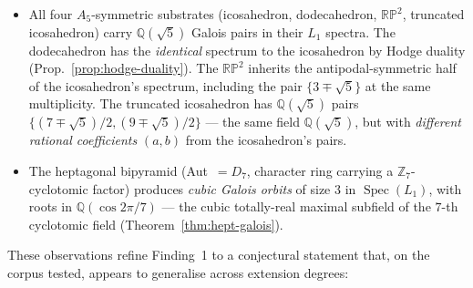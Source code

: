 \documentclass[12pt,a4paper]{article}
\theoremstyle{definition}
\theoremstyle{remark}
\newcommand{\bZ}{\mathbb{Z}}
\newcommand{\bQ}{\mathbb{Q}}                %
\DeclareMathOperator{\Spec}{Spec}
\begin{document}
\begin{itemize}\setlength{\itemsep}{2pt}
\item All four $A_5$-symmetric substrates (icosahedron, dodecahedron,
  $\mathbb{RP}^2$, truncated icosahedron) carry $\bQ(\sqrt 5)$ Galois
  pairs in their $L_1$ spectra. The dodecahedron has the
  \emph{identical} spectrum to the icosahedron by Hodge duality
  (Prop.~\ref{prop:hodge-duality}). The $\mathbb{RP}^2$ inherits the
  antipodal-symmetric half of the icosahedron's spectrum, including
  the pair $\{3 \mp \sqrt 5\}$ at the same multiplicity. The
  truncated icosahedron has $\bQ(\sqrt 5)$ pairs $\{(7 \mp \sqrt 5)/2,
  (9 \mp \sqrt 5)/2\}$ --- the same field $\bQ(\sqrt 5)$, but with
  \emph{different rational coefficients} $(a, b)$ from the
  icosahedron's pairs.
\item The heptagonal bipyramid (Aut~$= D_7$, character ring carrying
  a $\bZ_7$-cyclotomic factor) produces \emph{cubic Galois orbits} of
  size $3$ in $\Spec(L_1)$, with roots in $\bQ(\cos 2\pi/7)$ --- the
  cubic totally-real maximal subfield of the $7$-th cyclotomic field
  (Theorem~\ref{thm:hept-galois}).
\end{itemize}

These observations refine Finding~1 to a conjectural statement that, on
the corpus tested, appears to generalise across extension degrees:
\end{document}

